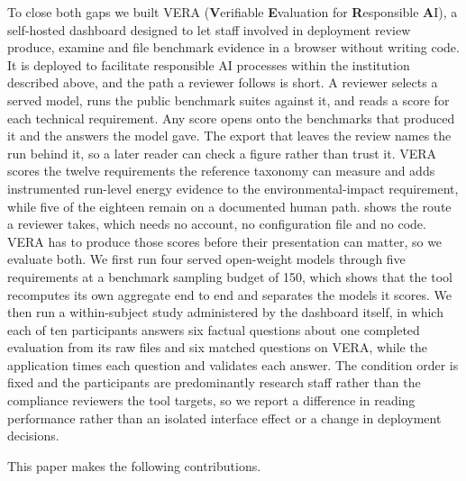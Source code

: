 \documentclass[10pt,conference]{IEEEtran}
\begin{document}
To close both gaps we built VERA (\textbf{V}erifiable \textbf{E}valuation for \textbf{R}esponsible \textbf{A}I), a self-hosted dashboard designed to let staff involved in deployment review produce, examine and file benchmark evidence in a browser without writing code.
It is deployed to facilitate responsible AI processes within the institution described above, and the path a reviewer follows is short.
A reviewer selects a served model, runs the public benchmark suites against it, and reads a score for each technical requirement.
Any score opens onto the benchmarks that produced it and the answers the model gave.
The export that leaves the review names the run behind it, so a later reader can check a figure rather than trust it.
VERA scores the twelve requirements the reference taxonomy can measure and adds instrumented run-level energy evidence to the environmental-impact requirement, while five of the eighteen remain on a documented human path.
 shows the route a reviewer takes, which needs no account, no configuration file and no code.
VERA has to produce those scores before their presentation can matter, so we evaluate both.
We first run four served open-weight models through five requirements at a benchmark sampling budget of 150, which shows that the tool recomputes its own aggregate end to end and separates the models it scores.
We then run a within-subject study administered by the dashboard itself, in which each of ten participants answers six factual questions about one completed evaluation from its raw files and six matched questions on VERA, while the application times each question and validates each answer.
The condition order is fixed and the participants are predominantly research staff rather than the compliance reviewers the tool targets, so we report a difference in reading performance rather than an isolated interface effect or a change in deployment decisions.

This paper makes the following contributions.
\end{document}
